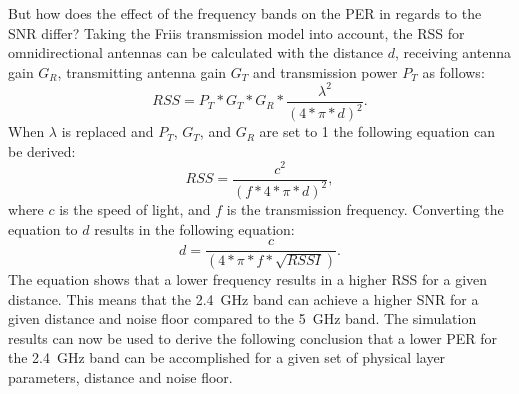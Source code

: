 But how does the effect of the frequency bands on the \ac{PER} in regards to the \ac{SNR} differ?
Taking the Friis transmission model \cite{shaw_radiometry_2013} into account, the \ac{RSS} for omnidirectional antennas can be calculated with the distance $d$,
receiving antenna gain $G_{R}$, transmitting antenna gain $G_{T}$ and transmission power $P_{T}$  as follows:
\begin{equation}
   RSS = P_{T} * G_{T} * G_{R} * \frac{\lambda^2}{(4 * \pi * d)^2}.
\end{equation}
When $\lambda$ is replaced and  $P_{T}$,  $G_{T}$,  and $G_{R}$ are set to \num{1} the following equation can be derived:
\begin{equation}
   RSS = \frac{c^2}{(f* 4 * \pi * d)^2},
\end{equation}
where $c$ is the speed of light, and $f$ is the transmission frequency.
Converting the equation to $d$ results in the following equation:
\begin{equation}
   d = \frac{c}{(4 * \pi * f * \sqrt {RSSI})}.
\end{equation}
The equation shows that a lower frequency results in a higher \ac{RSS} for a given distance.
This means that the \SI{2.4}{\giga\hertz} band can achieve a higher \ac{SNR} for a given distance and noise floor
compared to the \SI{5}{\giga\hertz} band.
The simulation results can now be used to derive the following conclusion
that a lower \ac{PER} for the \SI{2.4}{\giga\hertz} band can be accomplished
for a given set of physical layer parameters, distance and noise floor.



